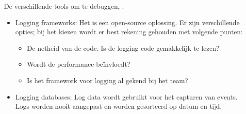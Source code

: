 De verschillende tools om te debuggen, \textcite{Swersky2019}:
\begin{itemize}
	\item Logging frameworks: Het is een open-source oplossing. Er zijn verschillende opties; bij het kiezen wordt er best rekening gehouden met volgende punten:
		\begin{itemize}
			\item De netheid van de code. Is de logging code gemakkelijk te lezen?
			\item Wordt de performance beïnvloedt?
			\item Is het framework voor logging al gekend bij het team?
		\end{itemize}
	\item Logging databases: Log data wordt gebruikt voor het capturen van events. Logs worden nooit aangepast en worden gesorteerd op datum en tijd. 
\end{itemize}



